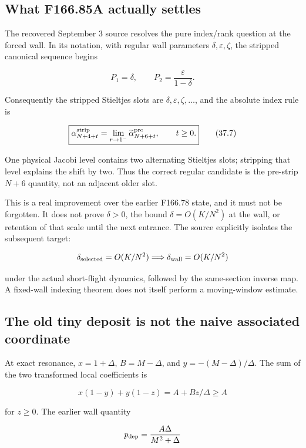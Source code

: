 \documentclass[
  10pt,
  a4paper,
  10pt,
  oneside,
  openany]{book}
\begin{document}
\subsection{What F166.85A actually
settles}\label{what-f166.85a-actually-settles}

The recovered September 3 source resolves the pure index/rank question
at the forced wall. In its notation, with regular wall parameters
\(\delta,\varepsilon,\zeta\), the stripped canonical sequence begins

\[
 P_1=\delta,\qquad P_2=\frac\varepsilon{1-\delta}.
\]

Consequently the stripped Stieltjes slots are
\(\delta,\varepsilon,\zeta,\ldots\), and the absolute index rule is

\[
 \boxed{
 \alpha^{\rm strip}_{N+4+t}
 =\lim_{r\to1^-}\widetilde\alpha^{\rm pre}_{N+6+t},
 \qquad t\ge0.}
 \tag{37.7}\label{eq:37.7}
\]

One physical Jacobi level contains two alternating Stieltjes slots;
stripping that level explains the shift by two. Thus the correct regular
candidate is the pre-strip \(N+6\) quantity, not an adjacent older slot.

This is a real improvement over the earlier F166.78 state, and it must
not be forgotten. It does not prove \(\delta>0\), the bound
\(\delta=O(K/N^2)\) at the wall, or retention of that scale until the
next entrance. The source explicitly isolates the subsequent target:

\[
 \delta_{\rm selected}=O(K/N^2)
 \Longrightarrow\delta_{\rm wall}=O(K/N^2)
\]

under the actual short-flight dynamics, followed by the same-section
inverse map. A fixed-wall indexing theorem does not itself perform a
moving-window estimate.

\subsection{The old tiny deposit is not the naive associated
coordinate}\label{the-old-tiny-deposit-is-not-the-naive-associated-coordinate}

At exact resonance, \(x=1+\Delta\), \(B=M-\Delta\), and
\(y=-(M-\Delta)/\Delta\). The sum of the two transformed local
coefficients is

\[
 x(1-y)+y(1-z)=A+Bz/\Delta\ge A
\]

for \(z\ge0\). The earlier wall quantity

\[
 p_{\rm dep}=\frac{A\Delta}{M^2+\Delta}
\]
\end{document}
